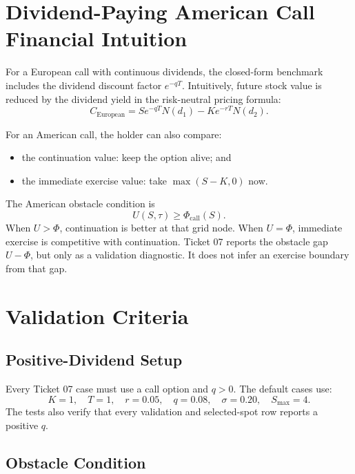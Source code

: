 \documentclass[11pt,a4paper]{article}
\begin{document}
\section{Dividend-Paying American Call Financial Intuition}

For a European call with continuous dividends, the closed-form benchmark includes the dividend
discount factor \(e^{-qT}\). Intuitively, future stock value is reduced by the dividend yield in
the risk-neutral pricing formula:
\begin{equation}
  C_{\mathrm{European}}
  = S e^{-qT} N(d_1) - K e^{-rT} N(d_2).
\end{equation}

For an American call, the holder can also compare:
\begin{itemize}
  \item the continuation value: keep the option alive; and
  \item the immediate exercise value: take \(\max(S-K,0)\) now.
\end{itemize}

The American obstacle condition is
\begin{equation}
  U(S,\tau) \geq \Phi_{\mathrm{call}}(S).
\end{equation}
When \(U>\Phi\), continuation is better at that grid node. When \(U=\Phi\), immediate exercise is
competitive with continuation. Ticket 07 reports the obstacle gap \(U-\Phi\), but only as a
validation diagnostic. It does not infer an exercise boundary from that gap.

\section{Validation Criteria}

\subsection{Positive-Dividend Setup}

Every Ticket 07 case must use a call option and \(q>0\). The default cases use:
\[
  K=1,\quad T=1,\quad r=0.05,\quad q=0.08,\quad \sigma=0.20,\quad S_{\max}=4.
\]
The tests also verify that every validation and selected-spot row reports a positive \(q\).

\subsection{Obstacle Condition}
\end{document}
